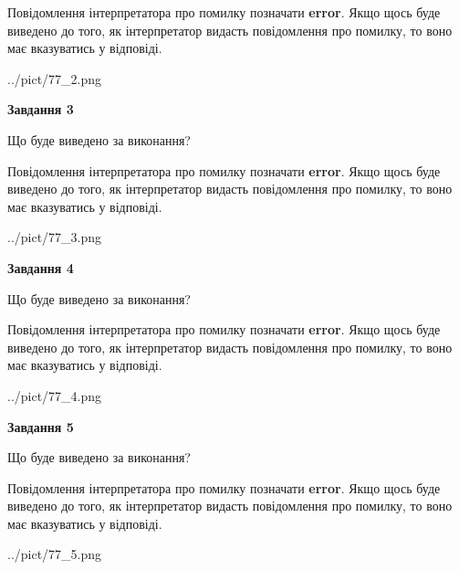 \documentclass[12pt, ukrainian]{article}
\begin{document}
{\begin {large}
Повідомлення інтерпретатора про помилку позначати \textbf{error}.
Якщо щось буде виведено до того, як інтерпретатор видасть повідомлення про помилку, 
то воно має вказуватись у відповіді. \par


\begin{center}
	{../pict/77_2.png}
\end{center}
\newpage

{\begin {center}\textbf{Завдання 3}\end {center}}\par
Що буде виведено за виконання?

Повідомлення інтерпретатора про помилку позначати \textbf{error}.
Якщо щось буде виведено до того, як інтерпретатор видасть повідомлення про помилку, 
то воно має вказуватись у відповіді. \par


\begin{center}
	{../pict/77_3.png}
\end{center}
\newpage

{\begin {center}\textbf{Завдання 4}\end {center}}\par
Що буде виведено за виконання?

Повідомлення інтерпретатора про помилку позначати \textbf{error}.
Якщо щось буде виведено до того, як інтерпретатор видасть повідомлення про помилку, 
то воно має вказуватись у відповіді. \par


\begin{center}
	{../pict/77_4.png}
\end{center}
\newpage

{\begin {center}\textbf{Завдання 5}\end {center}}\par
Що буде виведено за виконання?

Повідомлення інтерпретатора про помилку позначати \textbf{error}.
Якщо щось буде виведено до того, як інтерпретатор видасть повідомлення про помилку, 
то воно має вказуватись у відповіді. \par


\begin{center}
	{../pict/77_5.png}
\end{center}
\newpage


\end{large}}
\end{document}

